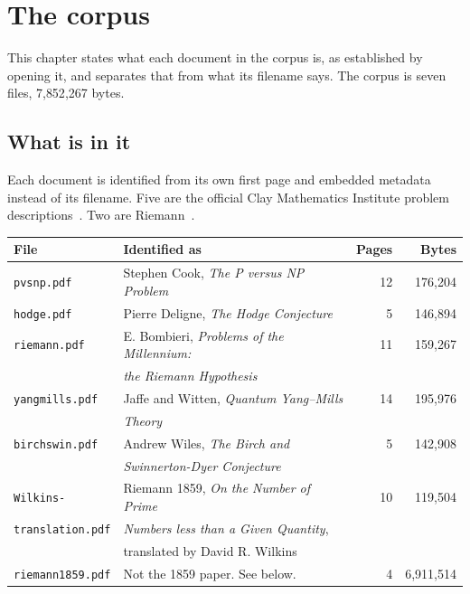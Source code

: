 \chapter{The corpus}

This chapter states what each document in the corpus is, as established by opening it, and separates
that from what its filename says. The corpus is seven files, 7{,}852{,}267 bytes.

\section{What is in it}

Each document is identified from its own first page and embedded metadata instead of its filename.
Five are the official Clay Mathematics Institute problem
descriptions~\cite{src:Cook,src:Deligne,src:Bombieri,src:Jaffe-and-Witten,src:Wiles}. Two are
Riemann~\cite{src:Wilkins-1998,src:Riemann-1859}.

\begin{center}
\begin{tabular}{@{}llrr@{}}
\toprule
File & Identified as & Pages & Bytes \\
\midrule
\texttt{pvsnp.pdf}       & Stephen Cook, \emph{The P versus NP Problem}      & 12 & 176{,}204 \\
\texttt{hodge.pdf}       & Pierre Deligne, \emph{The Hodge Conjecture}       & 5  & 146{,}894 \\
\texttt{riemann.pdf}     & E. Bombieri, \emph{Problems of the Millennium:}   & 11 & 159{,}267 \\
                         & \emph{the Riemann Hypothesis}                     &    &           \\
\texttt{yangmills.pdf}   & Jaffe and Witten, \emph{Quantum Yang--Mills}      & 14 & 195{,}976 \\
                         & \emph{Theory}                                     &    &           \\
\texttt{birchswin.pdf}   & Andrew Wiles, \emph{The Birch and}                & 5  & 142{,}908 \\
                         & \emph{Swinnerton-Dyer Conjecture}                 &    &           \\
\texttt{Wilkins-}        & Riemann 1859, \emph{On the Number of Prime}       & 10 & 119{,}504 \\
\texttt{translation.pdf} & \emph{Numbers less than a Given Quantity},         &    &           \\
                         & translated by David R. Wilkins                    &    &           \\
\texttt{riemann1859.pdf} & Not the 1859 paper. See below.                    & 4  & 6{,}911{,}514 \\
\bottomrule
\end{tabular}
\end{center}

